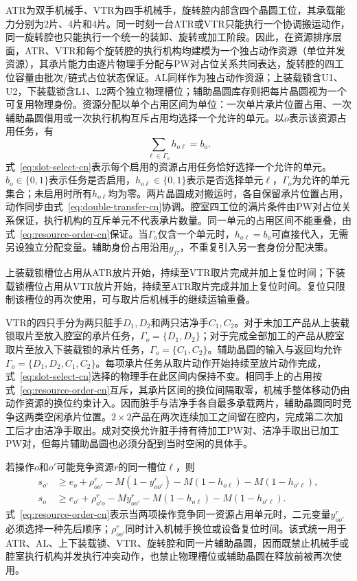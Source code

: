 \documentclass[final,5p,times,twocolumn]{elsarticle}
\begin{document}
ATR为双手机械手、VTR为四手机械手，旋转腔内部含四个晶圆工位，其承载能力分别为2片、4片和4片。同一时刻一台ATR或VTR只能执行一个协调搬运动作，同一旋转腔也只能执行一个统一的装卸、旋转或加工阶段。因此，在资源排序层面，ATR、VTR和每个旋转腔的执行机构均建模为一个独占动作资源（单位并发资源），其承片能力由逐片物理手分配与PW对占位关系共同表达，旋转腔的四工位容量由批次/链式占位状态保证。AL同样作为独占动作资源；上装载锁含U1、U2，下装载锁含L1、L2两个独立物理槽位；辅助晶圆库存则把每片晶圆视为一个可复用物理身份。资源分配以单个占用区间为单位：一次单片承片位置占用、一次辅助晶圆借用或一次执行机构互斥占用均选择一个允许的单元。以$o$表示该资源占用任务，有
\begin{equation}
\sum_{\ell\in\Gamma_o}h_{o\ell}=b_o.
\label{eq:slot-select-cn}
\end{equation}
式~\eqref{eq:slot-select-cn}表示每个启用的资源占用任务恰好选择一个允许的单元。$b_o\in\{0,1\}$表示任务是否启用，$h_{o\ell}\in\{0,1\}$表示是否选择单元$\ell$，$\Gamma_o$为允许的单元集合；未启用时所有$h_{o\ell}$均为零。两片晶圆成对搬运时，各自保留承片位置占用，动作同步由式~\eqref{eq:double-transfer-cn}协调。腔室四工位的满片条件由PW对占位关系保证，执行机构的互斥单元不代表承片数量。同一单元的占用区间不能重叠，由式~\eqref{eq:resource-order-cn}保证。当$\Gamma_o$仅含一个单元时，$h_{o\ell}=b_o$可直接代入，无需另设独立分配变量。辅助身份占用沿用$g_{j\tau}$，不重复引入另一套身份分配决策。

上装载锁槽位占用从ATR放片开始，持续至VTR取片完成并加上复位时间；下装载锁槽位占用从VTR放片开始，持续至ATR取片完成并加上复位时间。复位只限制该槽位的再次使用，可与取片后机械手的继续运输重叠。

VTR的四只手分为两只脏手$D_1,D_2$和两只洁净手$C_1,C_2$。对于未加工产品从上装载锁取片至放入腔室的承片任务，$\Gamma_o=\{D_1,D_2\}$；对于完成全部加工的产品从腔室取片至放入下装载锁的承片任务，$\Gamma_o=\{C_1,C_2\}$。辅助晶圆的输入与返回均允许$\Gamma_o=\{D_1,D_2,C_1,C_2\}$。每项承片任务从取片动作开始持续至放片动作完成，式~\eqref{eq:slot-select-cn}选择的物理手在此区间内保持不变。相同手上的占用按式~\eqref{eq:resource-order-cn}互斥，其承片区间的换位间隔取零，机械手整体移动仍由动作资源的换位约束计入。因而脏手与洁净手各自最多承载两片，辅助晶圆同时竞争这两类空闲承片位置。$2\times2$产品在两次连续加工之间留在腔内，完成第二次加工后才由洁净手取出。成对交换允许脏手持有待加工PW对、洁净手取出已加工PW对，但每片辅助晶圆也必须分配到当时空闲的具体手。

若操作$o$和$o'$可能竞争资源$r$的同一槽位$\ell$，则
\begin{equation}
\begin{aligned}
s_{o'}&\ge e_o+\rho^r_{oo'}-M(1-y^r_{oo'})
-M(1-h_{o\ell})-M(1-h_{o'\ell}),\\
s_o&\ge e_{o'}+\rho^r_{o'o}-My^r_{oo'}
-M(1-h_{o\ell})-M(1-h_{o'\ell}).
\end{aligned}
\label{eq:resource-order-cn}
\end{equation}
式~\eqref{eq:resource-order-cn}表示当两项操作竞争同一资源占用单元时，二元变量$y^r_{oo'}$必须选择一种先后顺序；$\rho^r_{oo'}$同时计入机械手换位或设备复位时间。该式统一用于ATR、AL、上下装载锁、VTR、旋转腔和同一片辅助晶圆，因而既禁止机械手或腔室执行机构并发执行冲突动作，也禁止物理槽位或辅助晶圆在释放前被再次使用。
\end{document}
